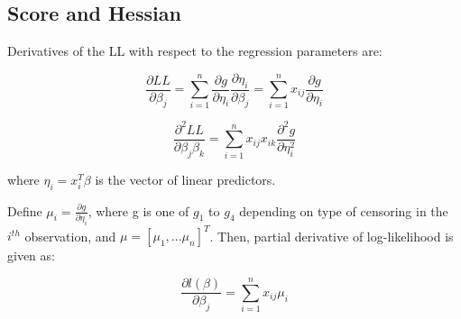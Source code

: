 \documentclass[12pt,a4paper]{report}
\begin{document}
\subsection*{Score and Hessian}

Derivatives of the LL with respect to the regression parameters are:

\begin{equation}
 \frac{\partial LL}{\partial \beta_j} = \sum_{i=1}^n \frac{\partial g}{\partial \eta_i}\frac{\partial \eta_i}{\partial \beta_j} = \sum_{i=1}^n x_{ij} \frac{\partial g}{\partial \eta_i}
\end{equation}

\begin{equation}
 \frac{\partial^2 LL}{\partial \beta_j \beta_k} = \sum_{i=1}^n x_{ij} x_{ik} \frac{\partial^2 g}{\partial \eta_i^2}
\end{equation}

where $\eta_i = x_i^T \beta$ is the vector of linear predictors.






\vspace{5mm}

Define $\mu_i = \frac{\partial g}{\partial \eta_i}$, where g is one of $g_1$ to $g_4$ depending on type of censoring in the $i^{th}$ observation, and $\mu = [\mu_1, ... \mu_n]^T$. Then, partial derivative of log-likelihood is given as:

\begin{equation}
\frac{\partial l(\beta)}{\partial \beta_j} = \sum_{i=1}^n x_{ij} \mu_i
\end{equation}
\end{document}
